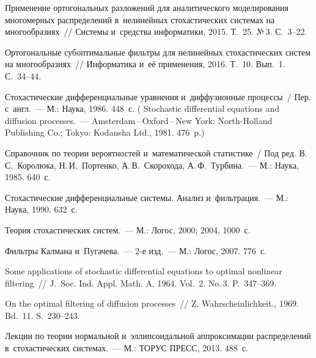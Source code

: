 \begin{multicols}{2}
{{\begin{thebibliography}{99}
Применение ортогональных разложений для аналитического моделирования
многомерных распределений в~нелинейных стохастических системах на
многообразиях~// Системы и~средства информатики, 2015. Т.~25. №\,3.
С.~3--22.

Ортогональные субоптимальные фильтры для нелинейных стохастических
систем на многообразиях~// Информатика и~её применения, 2016. Т.~10.
Вып.~1. С.~34--44.

 Стохастические дифференциальные уравнения 
и~диффузионные процессы~/ Пер. с~англ.~--- М.: Наука, 1986. 448~с.
( 
Stochastic differential equations and diffusion processes.~--- 
Amsterdam\,--\,Oxford\,--\,New York: North-Holland Publishing Co.; 
Tokyo: Kodansha Ltd., 1981. 476~p.)

Справочник по теории вероятностей и~математической статистике~/ Под
ред. В.\,С.~Королюка, Н.\,И.~Портенко, А.\,В.~Скорохода, А.\,Ф.~Турбина.~--- 
М.: Наука, 1985. 640~с.


Стохастические дифференциальные системы. Анализ и~фильтрация.~--- М.:
Наука,  1990.  632~с. 

Теория стохастических систем.~--- М.: Логос, 2000; 2004. 1000~с.


Фильтры Калмана и~Пугачева.~--- 2-е изд.~--- М.: Логос, 2007. 776~с.

Some applications of stochastic differential equations to optimal
nonlinear filtering~// J.~Soc. Ind. Appl. Math. A, 1964.
Vol.~2. No.\,3. P.~347--369.

On the optimal filtering of diffusion processes~// Z.
Wahrscheinlichkeit., 1969. Bd.~11. S.~230--243.


Лекции по теории нормальной и~эллипсоидальной аппроксимации
распределений в~стохастических системах.~--- М.: ТОРУС ПРЕСС, 2013.
488~с.
\end{thebibliography}

 }
 }

\end{multicols}

